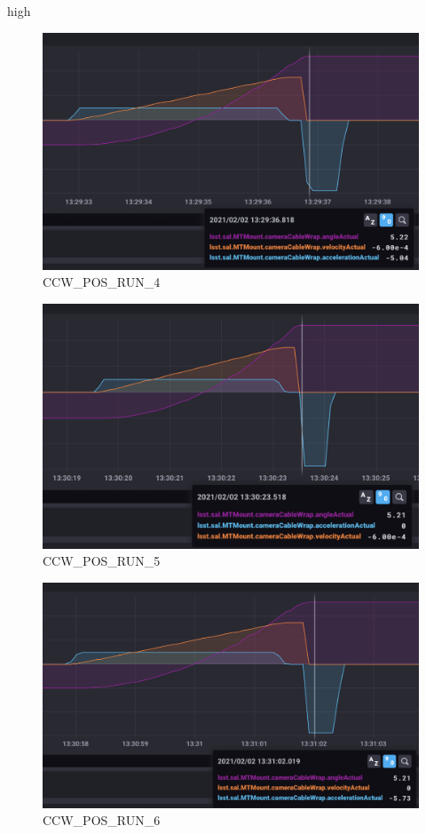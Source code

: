 high\documentclass[SE,lsstdraft,authoryear,toc]{lsstdoc}
\begin{document}
\begin{figure}[h!]
  \includegraphics[width=\linewidth]{media/CCW_design_speed_pos_test4.png}
  \caption{CCW\_POS\_RUN\_4}
  \label{fig:CCW_POS_RUN_4}
\end{figure}
\begin{figure}[h!]
  \includegraphics[width=\linewidth]{media/CCW_design_speed_pos_test5.png}
  \caption{CCW\_POS\_RUN\_5}
  \label{fig:CCW_POS_RUN_5}
\end{figure}
\begin{figure}[h!]
  \includegraphics[width=\linewidth]{media/CCW_design_speed_pos_test6.png}
  \caption{CCW\_POS\_RUN\_6}
  \label{fig:CCW_POS_RUN_6}
\end{figure}
\end{document}
